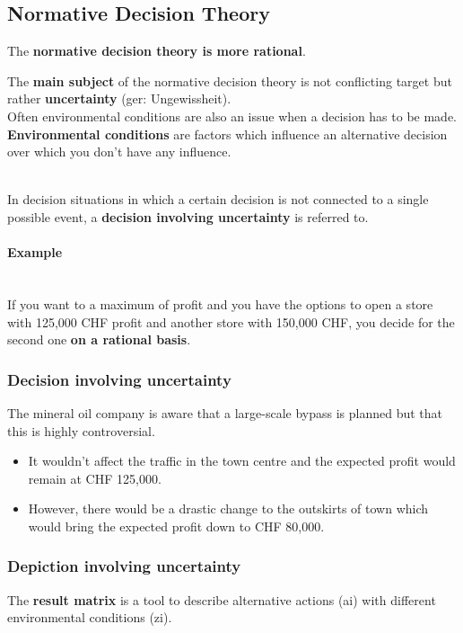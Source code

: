 \subsection{Normative Decision Theory}
The \textbf{normative decision theory is more rational}.

The \textbf{main subject} of the normative decision theory is not
conflicting target but rather \textbf{uncertainty} (ger: Ungewissheit).\\
Often environmental conditions are also an issue when a decision has to be made.
\textbf{Environmental conditions} are factors which influence an alternative
decision over which you don't have any influence.

\mbox{}\\
In decision situations in which a certain decision is not connected to a
single possible event, a \textbf{decision involving uncertainty} is referred to.

\paragraph{Example}\mbox{}\\
If you want to a maximum of profit and you have the options to open a store
with 125,000 CHF profit and another store with 150,000 CHF, you decide
for the second one \textbf{on a rational basis}.


\subsubsection{Decision involving uncertainty}
\label{sec:decision-involving-uncertainty}
The mineral oil company is aware that a large-scale bypass is planned
but that this is highly controversial.
\begin{itemize}
	\tightlist
	\item It wouldn't affect the traffic in the town centre and the expected
	profit would remain at CHF 125,000.
	\item However, there would be a drastic change to the outskirts of town
	which would bring the expected profit down to CHF 80,000.
\end{itemize}

\subsubsection{Depiction involving uncertainty}

The \textbf{result matrix} is a tool to describe alternative actions (ai) with
different environmental conditions (zi).

